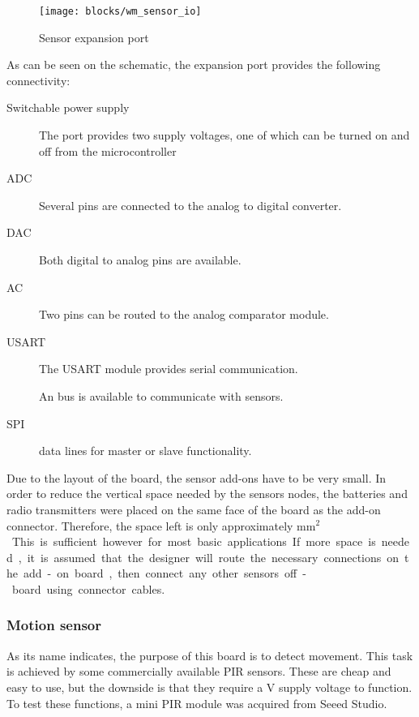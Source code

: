 \begin{figure}[!h]
  \begin{center}
    \texttt{[image: blocks/wm\_sensor\_io]}
  \end{center}
  \caption{Sensor expansion port}
  \label{fig:sensor-io}
\end{figure}

As can be seen on the schematic, the expansion port provides the following
connectivity:
\begin{description}
  \item [Switchable power supply] The port provides two supply voltages, one of
    which can be turned on and off from the microcontroller
  \item[ADC] Several pins are connected to the analog to digital converter.
  \item[DAC] Both digital to analog pins are available.
  \item[AC] Two pins can be routed to the analog comparator module.
  \item[USART] The USART module provides serial communication.
  \item[\IIC{}] An \IIC{} bus is available to communicate with sensors.
  \item[SPI] data lines for master or slave functionality.
\end{description}

Due to the layout of the board, the sensor add-ons have to be very small. In
order to reduce the vertical space needed by the sensors nodes, the batteries
and radio transmitters were placed on the same face of the board as the add-on
connector. Therefore, the space left is only approximately \unit[22x20]{mm$^2$}.
This is sufficient however for most basic applications. If more space is needed,
it is assumed that the designer will route the necessary connections on the
add-on board, then connect any other sensors off-board using connector cables.


\subsubsection{Motion sensor}

As its name indicates, the purpose of this board is to detect movement. This
task is achieved by some commercially available PIR sensors. These are cheap and
easy to use, but the downside is that they require a \unit[5]{V} supply voltage
to function. To test these functions, a mini PIR module was acquired from Seeed
Studio.


